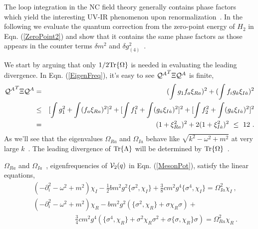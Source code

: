 \documentclass[a4paper,a4paper]{article}
\def\Tr{{\hbox{Tr}}}
\def\da{{\dot{a}}}
\def\cQ{{\cal Q}}
\begin{document}
The loop integration in the NC field theory generally contains phase factors 
which yield the 
interesting UV-IR phenomenon upon renormalization~\cite{MRS}. In the following 
we evaluate the quantum correction from the zero-point energy of 
$H_2$ in Eqn. (\ref{ZeroPoint2}) 
and show that it contains the same phase factors as those appears in 
the counter terms $\delta m^2$ and $\delta g^2_{(4)}$\ . 

We start by arguing that only $1/2\hbox{Tr}\{\Omega\}$ is needed in evaluating the 
leading divergence. 
In Eqn. (\ref{EigenFreq}), it's easy to see ${\cQ^A}^T\Xi\cQ^A$ is finite, 
\begin{eqnarray}
  {\cQ^A}^T\Xi\cQ^A&=&(\int g_1f_a\xi_{Ra})^2+(\int f_ig_\da\xi_{I\da})^2 \nonumber \\
                 &\leq&[\int g_1^2+\int (f_a\xi_{Ra})^2]^2+[\int f_1^2+\int (g_\da\xi_{I\da})^2]^2
                  +[\int f_2^2+\int (g_\da\xi_{I\da})^2]^2    \nonumber \\
                 &=&(1+\xi_{Ra}^2)^2+2(1+\xi_{I\da}^2)^2~\leq~ 12\ .
\end{eqnarray}
As we'll see that the eigenvalues $\Omega_{Ra}$ and $\Omega_{I\da}$ 
behave like $\sqrt{k^2-\omega^2+m^2}$ at very large $k$\ .
The leading divergence of 
$\hbox{Tr}\{\Lambda\}$ will be determined by $\Tr\{\Omega\}$\ . 

$\Omega_{Ra}$ and $\Omega_{I\da}$\ , eigenfrequencies of ${\cal V}_2(q)$ 
in Eqn. (\ref{MesonPot}), satisfy the linear equations, 
\begin{eqnarray}
  &&(-\partial_i^2-\omega^2+m^2)\chi_I-\frac 12bm^2g^2\{\sigma^2,\chi_I\}
+\frac 38cm^2g^4\{\sigma^4,\chi_I\}=\Omega_{I\da}^2\chi_I\ ,                                     \label{ChiIPot}
\\  &&(-\partial_i^2-\omega^2+m^2)\chi_R
-bm^2g^2(\{\sigma^2,\chi_R\}+\sigma\chi_R\sigma)+ \nonumber\\
&&\qquad\qquad\qquad\frac 34cm^2g^4(\{\sigma^4,\chi_R\}+\sigma^2\chi_R\sigma^2+\sigma\{\sigma,\chi_R\}\sigma)
=\Omega_{Ra}^2\chi_R\ .                                                                             \label{ChiRPot}
\end{eqnarray}
\end{document}
